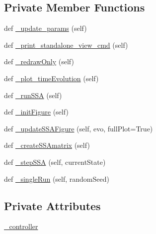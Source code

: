 \subsection*{Private Member Functions}
\begin{DoxyCompactItemize}
\item 
def \hyperlink{class_mu_mo_t_1_1_mu_mo_t_1_1_mu_mo_t_s_s_a_view_a47b00aaebcccf3c8dc2183a406404349}{\+\_\+update\+\_\+params} (self)
\item 
def \hyperlink{class_mu_mo_t_1_1_mu_mo_t_1_1_mu_mo_t_s_s_a_view_a3af54c33f997937b14f422e772d5280a}{\+\_\+print\+\_\+standalone\+\_\+view\+\_\+cmd} (self)
\item 
def \hyperlink{class_mu_mo_t_1_1_mu_mo_t_1_1_mu_mo_t_s_s_a_view_a57cea7fd9ea5c1805b9c18fc4b0adc0b}{\+\_\+redraw\+Only} (self)
\item 
def \hyperlink{class_mu_mo_t_1_1_mu_mo_t_1_1_mu_mo_t_s_s_a_view_ace35072dcd3e51e67107f62b4de0d5fe}{\+\_\+plot\+\_\+time\+Evolution} (self)
\item 
def \hyperlink{class_mu_mo_t_1_1_mu_mo_t_1_1_mu_mo_t_s_s_a_view_ab4e39bf1c45dbb1f9b6a6a5352de4d8f}{\+\_\+run\+S\+SA} (self)
\item 
def \hyperlink{class_mu_mo_t_1_1_mu_mo_t_1_1_mu_mo_t_s_s_a_view_a054aa0e8c130babbca21a6ff0e0fd31a}{\+\_\+init\+Figure} (self)
\item 
def \hyperlink{class_mu_mo_t_1_1_mu_mo_t_1_1_mu_mo_t_s_s_a_view_aae445216655e4d91f9b386249daf1541}{\+\_\+update\+S\+S\+A\+Figure} (self, evo, full\+Plot=True)
\item 
def \hyperlink{class_mu_mo_t_1_1_mu_mo_t_1_1_mu_mo_t_s_s_a_view_ac3f09eae4152f838b1693edc4203ee67}{\+\_\+create\+S\+S\+Amatrix} (self)
\item 
def \hyperlink{class_mu_mo_t_1_1_mu_mo_t_1_1_mu_mo_t_s_s_a_view_a1d2f8bb3e67d82bd01a95d58220d099b}{\+\_\+step\+S\+SA} (self, current\+State)
\item 
def \hyperlink{class_mu_mo_t_1_1_mu_mo_t_1_1_mu_mo_t_s_s_a_view_a51d421aacb4cd83af5f1c2e60c3dff9c}{\+\_\+single\+Run} (self, random\+Seed)
\end{DoxyCompactItemize}
\subsection*{Private Attributes}
\begin{DoxyCompactItemize}
\item 
\hyperlink{class_mu_mo_t_1_1_mu_mo_t_1_1_mu_mo_t_s_s_a_view_a15f56ca9811d1e67d721fa64f9b0dc1e}{\+\_\+controller}
\end{DoxyCompactItemize}
